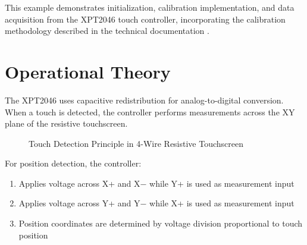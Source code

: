 This example demonstrates initialization, calibration implementation, and data acquisition from the XPT2046 touch controller, incorporating the calibration methodology described in the technical documentation \cite{MakingItUp:2017} \cite{batutay:2023}.

\section{Operational Theory}

The XPT2046 uses capacitive redistribution for analog-to-digital conversion. When a touch is detected, the controller performs measurements across the XY plane of the resistive touchscreen.

\begin{figure}[ht]
	\centering
	\caption{Touch Detection Principle in 4-Wire Resistive Touchscreen}
	\label{fig:touch_detection}
\end{figure}

For position detection, the controller:
\begin{enumerate}
	\item Applies voltage across X+ and X$-$ while Y+ is used as measurement input
	\item Applies voltage across Y+ and Y$-$ while X+ is used as measurement input
	\item Position coordinates are determined by voltage division proportional to touch position
\end{enumerate}

